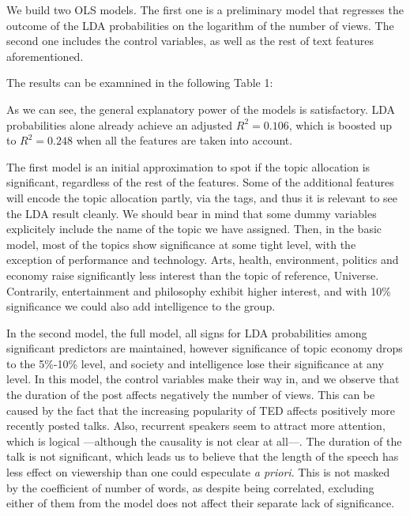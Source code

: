 \documentclass[a4paper, 11pt]{article} %
\begin{document}
We build two OLS models. The first one is a preliminary model that regresses the outcome of the LDA probabilities on the logarithm of the number of views. The second one includes the control variables, as well as the rest of text features aforementioned.

The results can be examnined in the following Table 1:
\pagebreak

\begin{center}

\end{center}
As we can see, the general explanatory power of the models is satisfactory. LDA probabilities alone already achieve an adjusted $R^2 = 0.106$, which is boosted up to $R^2 = 0.248$ when all the features are taken into account.

The first model is an initial approximation to spot if the topic allocation is significant, regardless of the rest of the features. Some of the additional features will encode the topic allocation partly, via the tags, and thus it is relevant to see the LDA result cleanly. We should bear in mind that some dummy variables explicitely include the name of the topic we have assigned. Then, in the basic model, most of the topics show significance at some tight level, with the exception of performance and technology. Arts, health, environment, politics and economy raise significantly less interest than the topic of reference, Universe. Contrarily, entertainment and philosophy exhibit higher interest, and with 10\% significance we could also add intelligence to the group.

In the second model, the full model, all signs for LDA probabilities among significant predictors are maintained, however significance of topic economy drops to the 5\%-10\% level, and society and intelligence lose their significance at any level. In this model, the control variables make their way in, and we observe that the duration of the post affects negatively the number of views. This can be caused by the fact that the increasing popularity of TED affects positively more recently posted talks. Also, recurrent speakers seem to attract more attention, which is logical ---although the causality is not clear at all---. The duration of the talk is not significant, which leads us to believe that the length of the speech has less effect on viewership than one could especulate \textit{a priori}. This is not masked by the coefficient of number of words, as despite being correlated, excluding either of them from the model does not affect their separate lack of significance.
\end{document}

